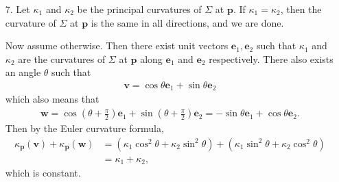 \documentclass[a4paper,12pt]{article}
\newcommand{\bs}{\boldsymbol}
\theoremstyle{remark}
\begin{document}
\begin{enumerate}
    \item[7.]
        Let $\kappa_1$ and $\kappa_2$ be the principal curvatures of $\Sigma$ at $\bs{p}$. If $\kappa_1 = \kappa_2$, then the curvature of $\Sigma$ at $\bs{p}$ is the same in all directions, and we are done. \par
        Now assume otherwise. Then there exist unit vectors $\bs{e}_1, \bs{e}_2$ such that $\kappa_1$ and $\kappa_2$ are the curvatures of $\Sigma$ at $\bs{p}$ along $\bs{e}_1$ and $\bs{e}_2$ respectively. There also exists an angle $\theta$ such that
        \begin{align*}
            \bs{v} = \cos\theta \bs{e}_1 + \sin\theta \bs{e}_2
        \end{align*}
        which also means that
        \begin{align*}
            \bs{w} = \cos\left( \theta + \frac{\pi}{2} \right) \bs{e}_1 + \sin\left( \theta + \frac{\pi}{2} \right) \bs{e}_2 = -\sin\theta \bs{e}_1 + \cos\theta \bs{e}_2.
        \end{align*}
        Then by the Euler curvature formula,
        \begin{align*}
            \kappa_{\bs{p}}(\bs{v}) + \kappa_{\bs{p}}(\bs{w}) &= (\kappa_1 \cos^2\theta + \kappa_2 \sin^2\theta) + (\kappa_1 \sin^2\theta + \kappa_2 \cos^2\theta) \\
            &= \kappa_1 + \kappa_2,
        \end{align*}
        which is constant.


\end{enumerate}
\end{document}
